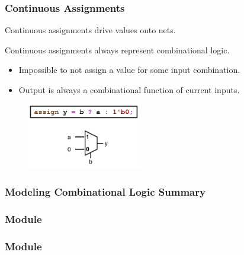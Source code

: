\documentclass[t, notes, xcolor=table]{beamer}
\begin{document}
\begin{frame}
\frametitle{Continuous Assignments}
Continuous assignments drive values onto nets.
\newline

Continuous assignments always represent combinational logic.
\begin{itemize}
\item Impossible to not assign a value for some input combination.
\item Output is always a combinational function of current inputs.
\end{itemize}
\vspace{10pt}
\begin{figure}
    \includegraphics[width=0.45\textwidth]{img/13_cont_assign.png}
\end{figure}
\end{frame}

\begin{frame}
\frametitle{Modeling Combinational Logic Summary}

\end{frame}
\note{
\scriptsize{


}
}

\begin{frame}
\frametitle{Module}

\end{frame}
\note{
\scriptsize{


}
}

\begin{frame}
\frametitle{Module}

\end{frame}
\note{
\scriptsize{


}
}
\end{document}
